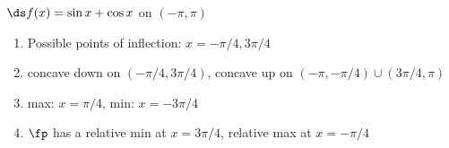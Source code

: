 {$\ds f(x) = \sin x + \cos x$ on $(-\pi,\pi)$
}
{\begin{enumerate}[label=(\alph*)]
\item Possible points of inflection: $x=-\pi/4,3\pi/4$
\item concave down on $(-\pi/4,3\pi/4)$,
concave up on $(-\pi,-\pi/4) \cup (3\pi/4,\pi)$
\item max: $x=\pi/4$, min: $x=-3\pi/4$
\item $\fp$ has a relative min at $x=3\pi/4$,
relative max at $x=-\pi/4$
\end{enumerate}}
